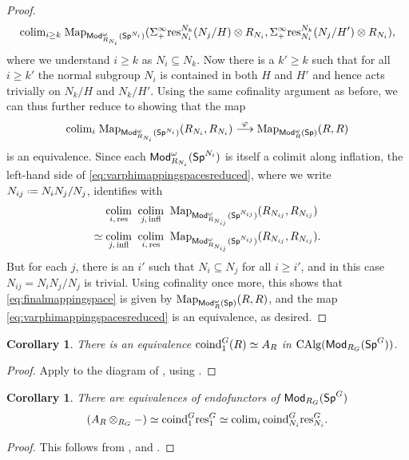 \documentclass[reqno]{amsart}
\numberwithin{equation}{section}\theoremstyle{thms}
\newtheorem{cor}[equation]{Corollary}
\theoremstyle{defn}
\newcommand{\tn}[1]{\textnormal{#1}}
\newcommand{\tsf}[1]{\textsf{\textup{#1}}}
\newcommand{\colimit}[1]{\underset{#1}{\tn{colim}} \;}
\newcommand*{\defeq}{\mathrel{\vcenter{\baselineskip0.4ex \lineskiplimit0pt
\hbox{\scriptsize.}\hbox{\scriptsize.}}}%
=}
\newcommand{\Map}{\tn{Map}}
\newcommand{\calg}{\tn{CAlg}}
\newcommand{\Mod}{\tsf{Mod}}
\newcommand{\spec}{\tsf{Sp}}
\newcommand{\specg}{\tsf{Sp}^G}
\begin{document}
\begin{proof}
$$\tn{colim}_{i \geq k} \; \Map_{\Mod_{R_{N_i}}^{\omega}(\spec^{N_i})}(\Sigma^{\infty}_+ \tn{res}^{N_k}_{N_i}(N_j/H) \otimes R_{N_i},\Sigma^{\infty}_+ \tn{res}^{N_k}_{N_i}(N_j/H') \otimes R_{N_i}),$$
where we understand $i \geq k$ as $N_i \subseteq N_k$. Now there is a $k' \geq k$ such that for all $i \geq k'$ the normal subgroup $N_i$ is contained in both $H$ and $H'$ and hence acts trivially on $N_k/H$ and $N_k/H'$. Using the same cofinality argument as before, we can thus further reduce to showing that the map
\begin{equation}\label{eq:varphimappingspacesreduced}
\tn{colim}_{i} \; \Map_{\Mod_{R_{N_i}}^{\omega}(\spec^{N_i})}(R_{N_i},R_{N_i}) \stackrel{\varphi}{\longrightarrow} \Map_{\Mod_{R}^{\omega}(\spec)}(R,R)
\end{equation}
is an equivalence. Since each $\Mod_{R_{N_i}}^{\omega}(\spec^{N_i})$ is itself a colimit along inflation, the left-hand side of \ref{eq:varphimappingspacesreduced}, where we write $N_{ij} \defeq N_iN_j/N_j$, identifies with
\begin{align}
&\colimit{i, \, \tn{res}} \; \colimit{j, \, \tn{infl}} \; \Map_{\Mod_{R_{N_{ij}}}^{\omega}(\spec^{N_{ij}})}(R_{N_{ij}},R_{N_{ij}}) \notag \\
\simeq \; &\colimit{j, \, \tn{infl}} \; \colimit{i, \, \tn{res}} \; \Map_{\Mod_{R_{N_{ij}}}^{\omega}(\spec^{N_{ij}})}(R_{N_{ij}},R_{N_{ij}}). \label{eq:finalmappingspace}
\end{align}
But for each $j$, there is an $i'$ such that $N_i \subseteq N_j$ for all $i \geq i'$, and in this case $N_{ij}=N_iN_j/N_j$ is trivial. Using cofinality once more, this shows that \ref{eq:finalmappingspace} is given by $\Map_{\Mod_{R}^{\omega}(\spec)}(R,R)$, and the map \ref{eq:varphimappingspacesreduced} is an equivalence, as desired.
\end{proof}

\begin{cor}\label{cor:identifycolimitoforbits}
There is an equivalence $\tn{coind}^G_1(R) \simeq A_R$ in $\calg(\Mod_{R_G}(\specg))$.
\end{cor}
\begin{proof}
Apply  to the diagram of , using .
\end{proof}

\begin{cor}\label{cor:endofunctors}
There are equivalences of endofunctors of $\Mod_{R_G}(\specg)$
$$(A_R \otimes_{R_G} -) \simeq \tn{coind}^G_1\tn{res}^G_1 \simeq \tn{colim}_i \, \tn{coind}^G_{N_i}\tn{res}^G_{N_i}.$$
\end{cor}
\begin{proof}
This follows from ,  and .
\end{proof}
\end{document}
